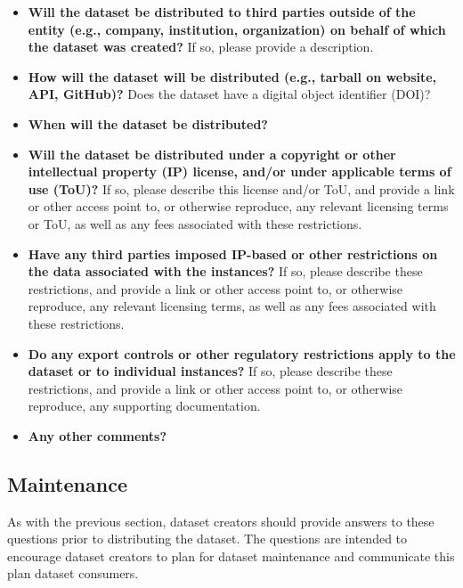 \begin{itemize}

\item \textbf{Will the dataset be distributed to third parties outside of the entity (e.g., company, institution, organization) on behalf of which the dataset was created?} If so, please provide a description.

\item \textbf{How will the dataset will be distributed (e.g., tarball on website, API, GitHub)?} Does the dataset have a digital object identifier (DOI)?

\item \textbf{When will the dataset be distributed?}

\item \textbf{Will the dataset be distributed under a copyright or other intellectual property (IP) license, and/or under applicable terms of use (ToU)?} If so, please describe this license and/or ToU, and provide a link or other access point to, or otherwise reproduce, any relevant licensing terms or ToU, as well as any fees associated with these restrictions.

\item \textbf{Have any third parties imposed IP-based or other restrictions on the data associated with the instances?} If so, please describe these restrictions, and provide a link or other access point to, or otherwise reproduce, any relevant licensing terms, as well as any fees associated with these restrictions.

\item \textbf{Do any export controls or other regulatory restrictions apply to the dataset or to individual instances?} If so, please describe these restrictions, and provide a link or other access point to, or otherwise reproduce, any supporting documentation.

\item \textbf{Any other comments?}

\end{itemize}

\subsection{Maintenance}

As with the  previous section, dataset creators
should provide answers to these questions prior to distributing the
dataset. The questions  are intended to
encourage dataset creators to plan for dataset maintenance and
communicate this plan  dataset consumers.\\

